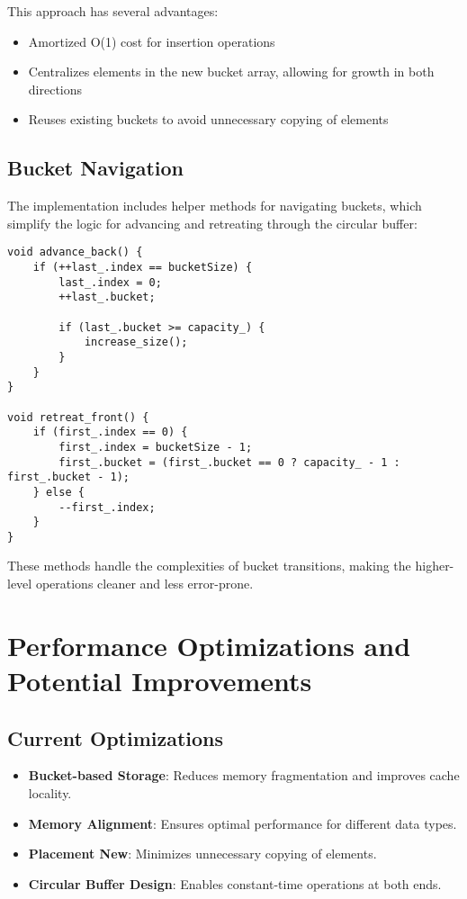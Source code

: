 \documentclass[a4paper,12pt]{article}
\begin{document}
This approach has several advantages:
\begin{itemize}
    \item Amortized O(1) cost for insertion operations
    \item Centralizes elements in the new bucket array, allowing for growth in both directions
    \item Reuses existing buckets to avoid unnecessary copying of elements
\end{itemize}

\subsection{Bucket Navigation}
The implementation includes helper methods for navigating buckets, which simplify the logic for advancing and retreating through the circular buffer:

\begin{lstlisting}
void advance_back() {
    if (++last_.index == bucketSize) {
        last_.index = 0;
        ++last_.bucket;

        if (last_.bucket >= capacity_) {
            increase_size();
        }
    }
}

void retreat_front() {
    if (first_.index == 0) {
        first_.index = bucketSize - 1;
        first_.bucket = (first_.bucket == 0 ? capacity_ - 1 : first_.bucket - 1);
    } else {
        --first_.index;
    }
}
\end{lstlisting}

These methods handle the complexities of bucket transitions, making the higher-level operations cleaner and less error-prone.

\section{Performance Optimizations and Potential Improvements}

\subsection{Current Optimizations}
\begin{itemize}
    \item \textbf{Bucket-based Storage}: Reduces memory fragmentation and improves cache locality.
    \item \textbf{Memory Alignment}: Ensures optimal performance for different data types.
    \item \textbf{Placement New}: Minimizes unnecessary copying of elements.
    \item \textbf{Circular Buffer Design}: Enables constant-time operations at both ends.
\end{itemize}
\end{document}
